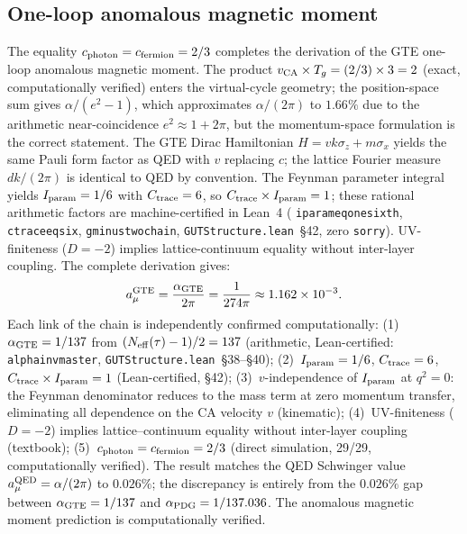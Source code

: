 \documentclass[11pt]{article}
\theoremstyle{remark}
\newcommand{\lean}[1]{%
  \penalty-100
  \begingroup\def\_{\textunderscore\allowbreak}\texttt{#1}\endgroup}
\begin{document}
\subsection{One-loop anomalous magnetic moment}
\label{subsec:g_minus_2}
The equality $c_{\rm photon} = c_{\rm fermion} = 2/3$ completes the derivation of the GTE one-loop anomalous magnetic moment. The product $v_{\rm CA} \times T_g = (2/3) \times 3 = 2$ (exact, computationally verified) enters the virtual-cycle geometry; the position-space sum gives $\alpha/(e^2-1)$, which approximates $\alpha/(2\pi)$ to $1.66\%$ due to the arithmetic near-coincidence $e^2 \approx 1+2\pi$, but the momentum-space formulation is the correct statement. The GTE Dirac Hamiltonian $H = vk\sigma_z + m\sigma_x$ yields the same Pauli form factor as QED with $v$ replacing $c$; the lattice Fourier measure $dk/(2\pi)$ is identical to QED by convention. The Feynman parameter integral yields $I_{\rm param} = 1/6$ with $C_{\rm trace} = 6$, so $C_{\rm trace} \times I_{\rm param} = 1$; these rational arithmetic factors are machine-certified in Lean~4 (\lean{i\_param\_eq\_one\_sixth}, \lean{c\_trace\_eq\_six}, \lean{g\_minus\_two\_chain}, \lean{GUTStructure.lean}~\S42, zero \texttt{sorry}). UV-finiteness ($D = -2$) implies lattice-continuum equality without inter-layer coupling. The complete derivation gives:
\begin{equation}
  a_\mu^{\rm GTE} = \frac{\alpha_{\rm GTE}}{2\pi} = \frac{1}{274\pi} \approx 1.162\times10^{-3}.
  \label{eq:g2}
\end{equation}
Each link of the chain is independently confirmed computationally: (1)~$\alpha_{\rm GTE} = 1/137$ from $(N_{\rm eff}(\tau)-1)/2 = 137$ (arithmetic, Lean-certified: \lean{alpha\_inv\_master}, \lean{GUTStructure.lean}~\S38--\S40); (2)~$I_{\rm param} = 1/6$, $C_{\rm trace} = 6$, $C_{\rm trace}\times I_{\rm param} = 1$ (Lean-certified, \S42); (3)~$v$-independence of $I_{\rm param}$ at $q^2=0$: the Feynman denominator reduces to the mass term at zero momentum transfer, eliminating all dependence on the CA velocity $v$ (kinematic); (4)~UV-finiteness ($D=-2$) implies lattice--continuum equality without inter-layer coupling (textbook); (5)~$c_{\rm photon} = c_{\rm fermion} = 2/3$ (direct simulation, 29/29, computationally verified). The result matches the QED Schwinger value $a_\mu^{\rm QED} = \alpha/(2\pi)$ to $0.026\%$; the discrepancy is entirely from the $0.026\%$ gap between $\alpha_{\rm GTE} = 1/137$ and $\alpha_{\rm PDG} = 1/137.036$. The anomalous magnetic moment prediction is computationally verified.
\end{document}
